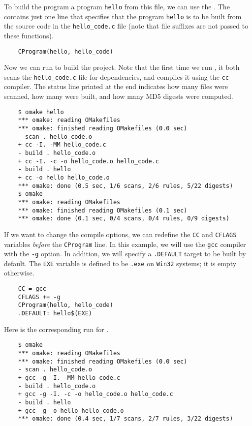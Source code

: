 To build the program a program \verb+hello+ from this file, we can use the
.
The  contains just one line that specifies that the program \verb+hello+ is
to be built from the source code in the \verb+hello_code.c+ file (note that file suffixes
are not passed to these functions).

\begin{verbatim}
    CProgram(hello, hello_code)
\end{verbatim}

Now we can run  to build the project.  Note that the first time we run ,
it both scans the \verb+hello_code.c+ file for dependencies, and compiles it using the \verb+cc+
compiler.  The status line printed at the end indicates how many files were scanned, how many
were built, and how many MD5 digests were computed.

\begin{verbatim}
    $ omake hello
    *** omake: reading OMakefiles
    *** omake: finished reading OMakefiles (0.0 sec)
    - scan . hello_code.o
    + cc -I. -MM hello_code.c
    - build . hello_code.o
    + cc -I. -c -o hello_code.o hello_code.c
    - build . hello
    + cc -o hello hello_code.o
    *** omake: done (0.5 sec, 1/6 scans, 2/6 rules, 5/22 digests)
    $ omake
    *** omake: reading OMakefiles
    *** omake: finished reading OMakefiles (0.1 sec)
    *** omake: done (0.1 sec, 0/4 scans, 0/4 rules, 0/9 digests)
\end{verbatim}

If we want to change the compile options, we can redefine the \verb+CC+ and \verb+CFLAGS+
variables \emph{before} the \verb+CProgram+ line.  In this example, we will use the \verb+gcc+
compiler with the \verb+-g+ option.  In addition, we will specify a \verb+.DEFAULT+ target
to be built by default.  The \verb+EXE+ variable is defined to be \verb+.exe+ on \verb+Win32+
systems; it is empty otherwise.

\begin{verbatim}
    CC = gcc
    CFLAGS += -g
    CProgram(hello, hello_code)
    .DEFAULT: hello$(EXE)
\end{verbatim}

Here is the corresponding run for .

\begin{verbatim}
    $ omake
    *** omake: reading OMakefiles
    *** omake: finished reading OMakefiles (0.0 sec)
    - scan . hello_code.o
    + gcc -g -I. -MM hello_code.c
    - build . hello_code.o
    + gcc -g -I. -c -o hello_code.o hello_code.c
    - build . hello
    + gcc -g -o hello hello_code.o
    *** omake: done (0.4 sec, 1/7 scans, 2/7 rules, 3/22 digests)
\end{verbatim}

